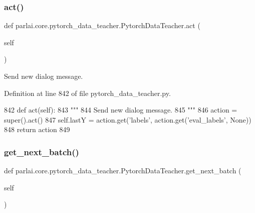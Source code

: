 \subsubsection{\texorpdfstring{act()}{act()}}
{\footnotesize\ttfamily def parlai.\+core.\+pytorch\+\_\+data\+\_\+teacher.\+Pytorch\+Data\+Teacher.\+act (\begin{DoxyParamCaption}\item[{}]{self }\end{DoxyParamCaption})}

\begin{DoxyVerb}Send new dialog message.
\end{DoxyVerb}
 

Definition at line 842 of file pytorch\+\_\+data\+\_\+teacher.\+py.


\begin{DoxyCode}
842     \textcolor{keyword}{def }act(self):
843         \textcolor{stringliteral}{"""}
844 \textcolor{stringliteral}{        Send new dialog message.}
845 \textcolor{stringliteral}{        """}
846         action = super().act()
847         self.lastY = action.get(\textcolor{stringliteral}{'labels'}, action.get(\textcolor{stringliteral}{'eval\_labels'}, \textcolor{keywordtype}{None}))
848         \textcolor{keywordflow}{return} action
849 
\end{DoxyCode}
\mbox{\label{classparlai_1_1core_1_1pytorch__data__teacher_1_1PytorchDataTeacher_a6bf71f580e9be5b517897260f76178c4}} 
\subsubsection{\texorpdfstring{get\+\_\+next\+\_\+batch()}{get\_next\_batch()}}
{\footnotesize\ttfamily def parlai.\+core.\+pytorch\+\_\+data\+\_\+teacher.\+Pytorch\+Data\+Teacher.\+get\+\_\+next\+\_\+batch (\begin{DoxyParamCaption}\item[{}]{self }\end{DoxyParamCaption})}

